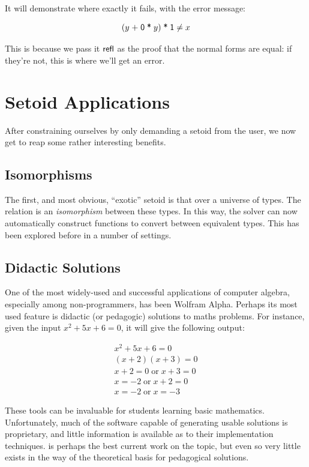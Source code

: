 \documentclass[draft, twocolumn]{article}
\theoremstyle{definition}
\theoremstyle{definition}
\begin{document}

It will demonstrate where exactly it fails, with the error message:

\[
 (y \; \AgdaFunction{+} \; \AgdaNumber{0} \; \AgdaFunction{*} \; y) \;
 \AgdaFunction{*} \;
 \AgdaNumber{1} \neq x
\]

This is because we pass it \(\AgdaField{refl}\) as the proof that the normal
forms are equal: if they're not, this is where we'll get an error.
\section{Setoid Applications}
After constraining ourselves by only demanding a setoid from the user, we now
get to reap some rather interesting benefits.
\subsection{Isomorphisms}
The first, and most obvious, ``exotic'' setoid is that over a universe of types.
The relation is an \emph{isomorphism} between these types. In this way, the
solver can now automatically construct functions to convert between equivalent
types. This has been explored before in a number of settings.
\subsection{Didactic Solutions}
One of the most widely-used and successful applications of computer algebra,
especially among non-programmers, has been Wolfram
Alpha\cite{wolfram_research_inc._wolframalpha_2019}. Perhaps its most used
feature is didactic (or pedagogic) solutions to maths
problems\cite{the_development_team_step-by-step_2009}. For instance, given the
input \(x^2 + 5 x + 6 = 0\), it will give the following output:

\begin{align*}
  x^2 + 5x + 6   = 0 \\
  (x + 2)(x + 3) = 0 \\
  x + 2 = 0   \; \text{or} \; x + 3 = 0 \\
  x     = -2  \; \text{or} \; x + 2 = 0 \\
  x     = -2  \; \text{or} \; x     = -3
\end{align*}

These tools can be invaluable for students learning basic mathematics.
Unfortunately, much of the software capable of generating usable solutions is
proprietary, and little information is available as to their implementation
techniques.\cite{lioubartsev_constructing_2016} is perhaps the best current work
on the topic, but even so very little exists in the way of the theoretical basis
for pedagogical solutions.
\end{document}

